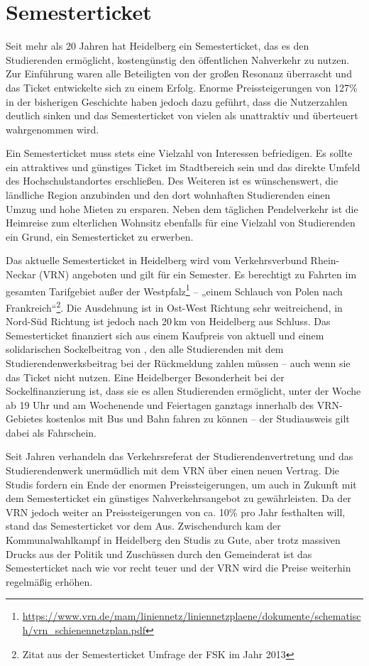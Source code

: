 \section{Semesterticket}
Seit mehr als 20 Jahren hat Heidelberg ein Semesterticket, das es den Studierenden ermöglicht, kostengünstig den öffentlichen Nahverkehr zu nutzen. Zur Einführung waren alle Beteiligten von der großen Resonanz überrascht und das Ticket entwickelte sich zu einem Erfolg. Enorme Preissteigerungen von 127\% in der bisherigen Geschichte haben jedoch dazu geführt, dass die Nutzerzahlen deutlich sinken und das Semesterticket von vielen als unattraktiv und überteuert wahrgenommen wird.

Ein Semesterticket muss stets eine Vielzahl von Interessen befriedigen. Es sollte ein attraktives und günstiges Ticket im Stadtbereich sein und das direkte Umfeld des Hochschulstandortes erschließen. Des Weiteren ist es wünschenswert, die ländliche Region anzubinden und den dort wohnhaften Studierenden einen Umzug und hohe Mieten zu ersparen. Neben dem täglichen Pendelverkehr ist die Heimreise zum elterlichen Wohnsitz ebenfalls für eine Vielzahl von Studierenden ein Grund, ein Semesterticket zu erwerben.

Das aktuelle Semesterticket in Heidelberg wird vom Verkehrsverbund Rhein-Neckar (VRN) angeboten und gilt für ein Semester. Es berechtigt zu Fahrten im gesamten Tarifgebiet außer der Westpfalz\footnote{\url{https://www.vrn.de/mam/liniennetz/liniennetzplaene/dokumente/schematisch/vrn_schienennetzplan.pdf}} -- „einem Schlauch von Polen nach Frankreich“\footnote{Zitat aus der Semesterticket Umfrage der FSK im Jahr 2013}. Die Ausdehnung ist in Ost-West Richtung sehr weitreichend, in Nord-Süd Richtung ist jedoch nach 20\,km von Heidelberg aus Schluss. Das Semesterticket finanziert sich aus einem Kaufpreis von aktuell \EUR{\semesterticket} und einem solidarischen Sockelbeitrag von \EUR{\sockelbeitrag}, den alle Studierenden mit dem Studierendenwerksbeitrag bei der Rückmeldung zahlen müssen -- auch wenn sie das Ticket nicht nutzen. Eine Heidelberger Besonderheit bei der Sockelfinanzierung ist, dass sie es allen Studierenden ermöglicht, unter der Woche ab 19 Uhr und am Wochenende und Feiertagen ganztags innerhalb des VRN-Gebietes kostenlos mit Bus und Bahn fahren zu können -- der Studiausweis gilt dabei als Fahrschein.

Seit Jahren verhandeln das Verkehrsreferat der Studierendenvertretung und das Studierendenwerk unermüdlich mit dem VRN über einen neuen Vertrag. Die Studis fordern ein Ende der enormen Preissteigerungen, um auch in Zukunft mit dem Semesterticket ein günstiges Nahverkehrsangebot zu gewährleisten. Da der VRN jedoch weiter an Preissteigerungen von ca. 10\% pro Jahr festhalten will, stand das Semesterticket vor dem Aus. Zwischendurch kam der Kommunalwahlkampf in Heidelberg den Studis zu Gute, aber trotz massiven Drucks aus der Politik und Zuschüssen durch den Gemeinderat ist das Semesterticket nach wie vor recht teuer und der VRN wird die Preise weiterhin regelmäßig erhöhen.

